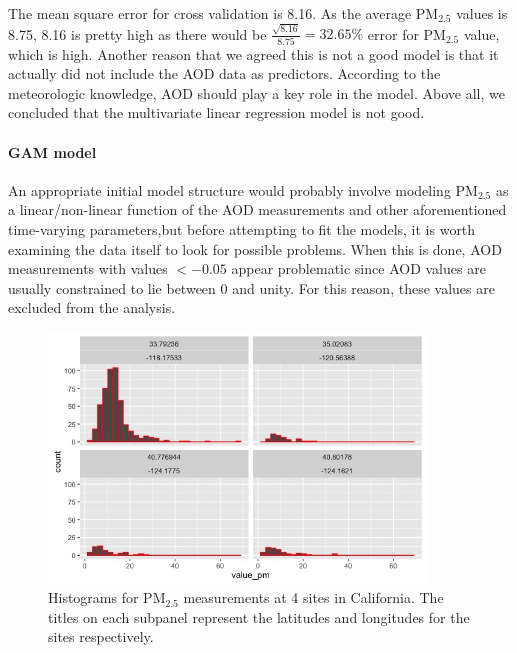 \documentclass[10pt]{article}
\begin{document}
The mean square error for cross validation is 8.16. As the average PM$_{2.5}$ values is 8.75, 8.16 is pretty high as there would be $\frac{\sqrt{8.16}}{8.75}=32.65\%$ error for PM$_{2.5}$ value, which is high. Another reason that we agreed this is not a good model is that it actually did not include the AOD data as predictors. According to the meteorologic knowledge, AOD should play a key role in the model. Above all, we concluded that the multivariate linear regression model is not good.

\paragraph{GAM model}

An appropriate initial model structure would probably involve modeling PM$_{2.5}$ as a linear/non-linear function of the AOD measurements and other aforementioned time-varying parameters,but before attempting to fit the models, it is worth examining the data itself to look for possible problems. When this is done, AOD measurements with values $< -0.05$ appear problematic since AOD values are usually constrained to lie between 0 and unity. For this reason, these values are excluded from the analysis. 

\begin{figure}[H]
\centering
\includegraphics[width=100mm]{histpmcali.jpeg}
\caption{Histograms for PM$_{2.5}$ measurements at 4 sites in California. The titles on each subpanel represent the latitudes and longitudes for the sites respectively.}
\end{figure}
\end{document}
